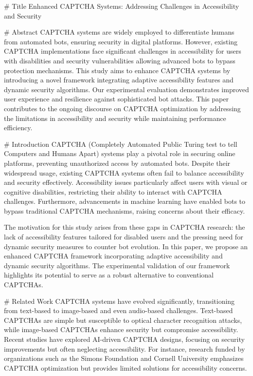 # Title  
Enhanced CAPTCHA Systems: Addressing Challenges in Accessibility and Security  

# Abstract  
CAPTCHA systems are widely employed to differentiate humans from automated bots, ensuring security in digital platforms. However, existing CAPTCHA implementations face significant challenges in accessibility for users with disabilities and security vulnerabilities allowing advanced bots to bypass protection mechanisms. This study aims to enhance CAPTCHA systems by introducing a novel framework integrating adaptive accessibility features and dynamic security algorithms. Our experimental evaluation demonstrates improved user experience and resilience against sophisticated bot attacks. This paper contributes to the ongoing discourse on CAPTCHA optimization by addressing the limitations in accessibility and security while maintaining performance efficiency.  

# Introduction  
CAPTCHA (Completely Automated Public Turing test to tell Computers and Humans Apart) systems play a pivotal role in securing online platforms, preventing unauthorized access by automated bots. Despite their widespread usage, existing CAPTCHA systems often fail to balance accessibility and security effectively. Accessibility issues particularly affect users with visual or cognitive disabilities, restricting their ability to interact with CAPTCHA challenges. Furthermore, advancements in machine learning have enabled bots to bypass traditional CAPTCHA mechanisms, raising concerns about their efficacy.  

The motivation for this study arises from these gaps in CAPTCHA research: the lack of accessibility features tailored for disabled users and the pressing need for dynamic security measures to counter bot evolution. In this paper, we propose an enhanced CAPTCHA framework incorporating adaptive accessibility and dynamic security algorithms. The experimental validation of our framework highlights its potential to serve as a robust alternative to conventional CAPTCHAs.  

# Related Work  
CAPTCHA systems have evolved significantly, transitioning from text-based to image-based and even audio-based challenges. Text-based CAPTCHAs are simple but susceptible to optical character recognition attacks, while image-based CAPTCHAs enhance security but compromise accessibility. Recent studies have explored AI-driven CAPTCHA designs, focusing on security improvements but often neglecting accessibility. For instance, research funded by organizations such as the Simons Foundation and Cornell University emphasizes CAPTCHA optimization but provides limited solutions for accessibility concerns.  

